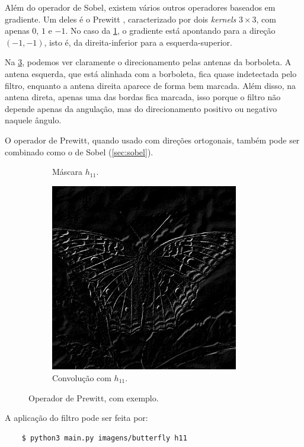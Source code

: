 Além do operador de Sobel, existem vários outros operadores baseados em gradiente. Um deles é o Prewitt \autocite{ref:prewitt}, caracterizado por dois \textit{kernels} $3 \times 3$, com apenas $0$, $1$ e $-1$. No caso da \cref{fig:h11}, o gradiente está apontando para a direção $(-1, -1)$, isto é, da direita-inferior para a esquerda-superior.

Na \cref{fig:grad}, podemos ver claramente o direcionamento pelas antenas da borboleta. A antena esquerda, que está alinhada com a borboleta, fica quase indetectada pelo filtro, enquanto a antena direita aparece de forma bem marcada. Além disso, na antena direta, apenas uma das bordas fica marcada, isso porque o filtro não depende apenas da angulação, mas do direcionamento positivo ou negativo naquele ângulo.

O operador de Prewitt, quando usado com direções ortogonais, também pode ser combinado como o de Sobel (\cref{sec:sobel}).

\begin{figure}[H]
    \centering
    \begin{subfigure}{0.48\textwidth}
        \centering
        

        \caption{Máscara $h_{11}$.}
        \label{fig:h11}
    \end{subfigure}%
    \begin{subfigure}{0.48\textwidth}
        \centering
        \includegraphics[width=0.9\textwidth]{resultados/butterfly_h11.png}
        \caption{Convolução com $h_{11}$.}
        \label{fig:grad}
    \end{subfigure}

    \caption{Operador de Prewitt, com exemplo.}
\end{figure}

A aplicação do filtro pode ser feita por:

\begin{verbatim}
    $ python3 main.py imagens/butterfly h11
\end{verbatim}
